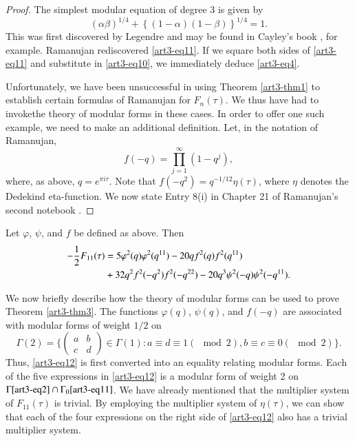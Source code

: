 \begin{proof}
The simplest modular equation of degree 3 is given by 
\begin{equation}
(\alpha \beta)^{1/4} + \left\{(1-\alpha) (1-\beta) \right\}^{1/4} =1. \label{art3-eq11}
\end{equation}
This was first discovered by Legendre and may be found in Cayley's book \cite[p. 196]{art3-key7}, for example. Ramanujan \cite[chpater 19, Entry 5(ii)]{art3-key9} rediscovered \eqref{art3-eq11}. If we square both sides of \eqref{art3-eq11} and substitute in \eqref{art3-eq10}, we immediately deduce \eqref{art3-eq4}.

Unfortunately, we have been unsuccessful in using Theorem \ref{art3-thm1} to establish certain formulas of Ramanujan for $F_n (\tau)$. We thus have had to invoke\pageoriginale the theory of modular forms in these cases. In order to offer one such example, we need to make an additional definition. Let, in the notation of Ramanujan, 
$$
f(-q) = \prod\limits^\infty_{j=1} (1-q^j),
$$
where, as above, $q = e^{\pi i \tau}$. Note that $f(-q^2) = q^{-1/12}\eta(\tau)$, where $\eta$ denotes the Dedekind eta-function. We now state Entry 8(i) in Chapter 21 of Ramanujan's second notebook \cite{art3-key9}.
\end{proof}

\begin{theorem}\label{art3-thm3}
Let $\varphi$, $\psi$, and $f$ be defined as above. Then 
\begin{align}
-\frac{1}{2} F_{11} (\tau) & = 5 \varphi^2 (q) \varphi^2 (q^{11}) - 20 qf^2 (q) f^2 (q^{11}) \label{art3-eq12}\\
& + 32 q^2 f^2 (-q^2) f^2 (-q^{22}) - 20 q^3 \psi^2 (-q) \psi^2 (-q^{11}).\notag
\end{align}
\end{theorem}

We now briefly describe how the theory of modular forms can be used to prove Theorem \ref{art3-thm3}. The functions $\varphi (q)$, $\psi (q)$, and $f(-q)$ are associated with modular forms of weight $1/2$ on 
$$
\Gamma (2) = \{\begin{pmatrix}
a & b \\
c & d
\end{pmatrix} \in \Gamma (1) : a\equiv d \equiv 1 (\mod 2), b \equiv c \equiv 0 (\mod 2)\}.
$$
Thus, \eqref{art3-eq12} is first converted into an equality relating modular forms. Each of the five expressions in \eqref{art3-eq12} is a modular form of weight 2 on $\Gamma \eqref{art3-eq2} \cap \Gamma_0 \eqref{art3-eq11}$. We have already mentioned that the multiplier system of $F_{11} (\tau)$ is trivial. By employing the multiplier system of $\eta(\tau)$, we can show that each of the four expressions on the right side of \eqref{art3-eq12} also has a trivial multiplier system.

